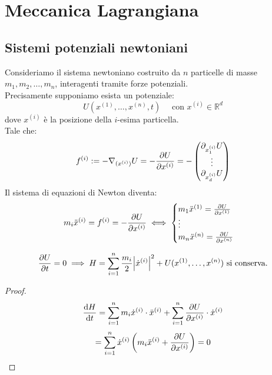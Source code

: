 \section{Meccanica Lagrangiana}


\subsection{Sistemi potenziali newtoniani}

Consideriamo il sistema newtoniano costruito da $n $ particelle di masse $m_1,m_2,\dots,m_n$, interagenti tramite forze potenziali.\\
Precisamente supponiamo esista un potenziale:
\begin{equation}
    U(x^{(1)}, \dots, x^{(n )},t) \quad \text{ con } x^{(i )}\in \mathbb{R}^d  
\end{equation}
dove $x^{(i )}$ è la posizione della $i $-esima particella.\\
Tale che:
\begin{equation}
    f^{(i)}:= -\nabla_{(x^{(i)})}U= -\pdv{U}{x^{(i)}}= -\begin{pmatrix}
        \partial_{x^{(i)}_1}U\\
        \vdots\\
        \partial_{x^{(i)}_d}U
    \end{pmatrix}
\end{equation}
Il sistema di equazioni di Newton diventa:
\begin{equation}
    m_i\ddot{x}^{(i)}= f^{(i)}= -\pdv{U}{x^{(i)}}\iff\begin{cases}
        m_1\ddot{x}^{(1)}= \pdv{U}{x^{(1)}}\\
        \vdots\\
        m_n \ddot{x}^{(n)}= \pdv{U}{x^{(n)}}
    \end{cases}
\end{equation}
\begin{theorem}
    \begin{equation*}
        \pdv{U}{t}=0\implies H = \sum_{i=1}^{n}\frac{m_i}{2}\abs{\dot{x}^{(i)}}^2 + U (x^{(1)},\dots,x^{(n)}) \text{  si conserva.}
    \end{equation*}
\end{theorem}
\begin{proof}
    \begin{equation*}
        \dv{H}{t}= \sum_{i=1}^{n} m_i \dot{x}^{(i)}\cdot\ddot{x}^{(i)}+ \sum_{i=1}^{n}\pdv{U}{x^{(i)}}\cdot \dot{x}^{(i)}
    \end{equation*}
    \begin{equation*}
        = \sum_{i=1}^{n} \dot{x}^{(i)}\left( m_i\ddot{x}^{(i)}+\pdv{U}{x^{(i)}} \right)=0
    \end{equation*}
\end{proof}

